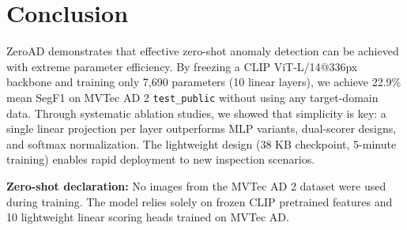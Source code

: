 \documentclass[10pt,twocolumn,letterpaper]{article}
\begin{document}
\section{Conclusion}

ZeroAD demonstrates that effective zero-shot anomaly detection can be achieved with extreme parameter efficiency. By freezing a CLIP ViT-L/14@336px backbone and training only 7,690 parameters (10 linear layers), we achieve 22.9\% mean SegF1 on MVTec AD 2 \texttt{test\_public} without using any target-domain data. Through systematic ablation studies, we showed that simplicity is key: a single linear projection per layer outperforms MLP variants, dual-scorer designs, and softmax normalization. The lightweight design (38 KB checkpoint, 5-minute training) enables rapid deployment to new inspection scenarios.

\textbf{Zero-shot declaration:} No images from the MVTec AD 2 dataset were used during training. The model relies solely on frozen CLIP pretrained features and 10 lightweight linear scoring heads trained on MVTec AD.

{
    \small
    
    
}
\end{document}
